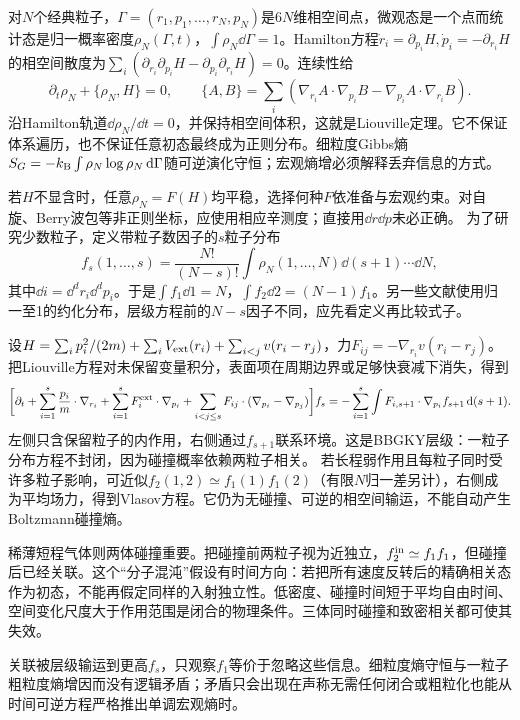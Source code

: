 \label{ch:bbgky}
对$N$个经典粒子，$\Gamma=(r_1,p_1,\ldots,r_N,p_N)$是$6N$维相空间点，微观态是一个点而统计态是归一概率密度$\rho_N(\Gamma,t)$，$\int\rho_N\dd\Gamma=1$。Hamilton方程$\dot r_i=\partial_{p_i}H,\dot p_i=-\partial_{r_i}H$的相空间散度为$\sum_i(\partial_{r_i}\partial_{p_i}H-\partial_{p_i}\partial_{r_i}H)=0$。连续性给
\begin{equation}
\partial_t\rho_N+\{\rho_N,H\}=0,\qquad\{A,B\}=\sum_i(\nabla_{r_i}A\cdot\nabla_{p_i}B-\nabla_{p_i}A\cdot\nabla_{r_i}B).
\end{equation}
沿Hamilton轨道$\dd\rho_N/\dd t=0$，并保持相空间体积，这就是Liouville定理。它不保证体系遍历，也不保证任意初态最终成为正则分布。细粒度Gibbs熵$S_G=-k_{\mathrm B}\int\rho_N\log\rho_N\,\mathrm d\Gamma$随可逆演化守恒；宏观熵增必须解释丢弃信息的方式。

若$H$不显含时，任意$\rho_N=F(H)$均平稳，选择何种$F$依准备与宏观约束。对自旋、Berry波包等非正则坐标，应使用相应辛测度；直接用$\dd r\dd p$未必正确。
为了研究少数粒子，定义带粒子数因子的$s$粒子分布
\begin{equation}
f_s(1,\ldots,s)=\frac{N!}{(N-s)!}\int\rho_N(1,\ldots,N)\dd(s+1)\cdots\dd N,
\end{equation}
其中$\dd i=\dd^dr_i\dd^dp_i$。于是$\int f_1\dd1=N$，$\int f_2\dd2=(N-1)f_1$。另一些文献使用归一至1的约化分布，层级方程前的$N-s$因子不同，应先看定义再比较式子。

设$H=\sum_ip_i^2/(2m)+\sum_iV_{\rm ext}(r_i)+\sum_{i<j}v(r_i-r_j)$，力$F_{ij}=-\nabla_{r_i}v(r_i-r_j)$。把Liouville方程对未保留变量积分，表面项在周期边界或足够快衰减下消失，得到
\begin{align}
\bigg[\partial_t+\sum_{i=1}^s\frac{p_i}{m}\cdot\nabla_{r_i}+\sum_{i=1}^sF_i^{\rm ext}\cdot\nabla_{p_i}+\sum_{i<j\le s}F_{ij}\cdot(\nabla_{p_i}-\nabla_{p_j})\bigg]f_s
=-\sum_{i=1}^s\int F_{i,s+1}\cdot\nabla_{p_i}f_{s+1}\,\mathrm d(s+1).
\end{align}
左侧只含保留粒子的内作用，右侧通过$f_{s+1}$联系环境。这是BBGKY层级：一粒子分布方程不封闭，因为碰撞概率依赖两粒子相关。
若长程弱作用且每粒子同时受许多粒子影响，可近似$f_2(1,2)\simeq f_1(1)f_1(2)$（有限$N$归一差另计），右侧成为平均场力，得到Vlasov方程。它仍为无碰撞、可逆的相空间输运，不能自动产生Boltzmann碰撞熵。

稀薄短程气体则两体碰撞重要。把碰撞前两粒子视为近独立，$f_2^{\rm in}\simeq f_1f_1$，但碰撞后已经关联。这个“分子混沌”假设有时间方向：若把所有速度反转后的精确相关态作为初态，不能再假定同样的入射独立性。低密度、碰撞时间短于平均自由时间、空间变化尺度大于作用范围是闭合的物理条件。三体同时碰撞和致密相关都可使其失效。

关联被层级输运到更高$f_s$，只观察$f_1$等价于忽略这些信息。细粒度熵守恒与一粒子粗粒度熵增因而没有逻辑矛盾；矛盾只会出现在声称无需任何闭合或粗粒化也能从时间可逆方程严格推出单调宏观熵时。
